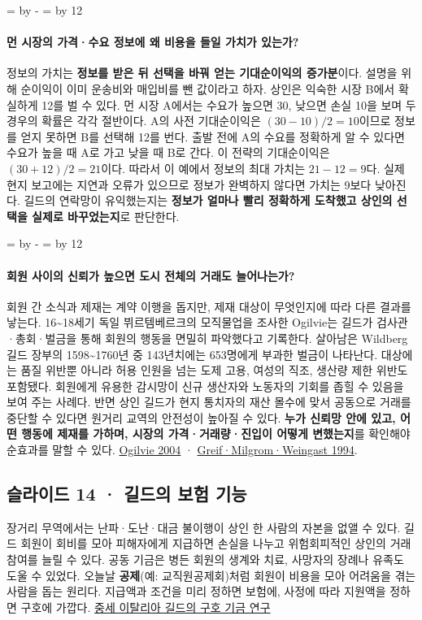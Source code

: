 \documentclass[10pt,a4paper]{article}
\newcommand{\ReserveQuestionSpace}{%
  \par\begingroup
  \dimen0=\pagegoal \advance\dimen0 by -\pagetotal
  \dimen2=\baselineskip \multiply\dimen2 by 12
  \ifdim\dimen0<\dimen2 \newpage\fi
  \endgroup}
\begin{document}
\ReserveQuestionSpace
\paragraph{먼 시장의 가격·수요 정보에 왜 비용을 들일 가치가 있는가?}

정보의 가치는 \textbf{정보를 받은 뒤 선택을 바꿔 얻는 기대순이익의 증가분}이다. 설명을 위해 순이익이 이미 운송비와 매입비를 뺀 값이라고 하자. 상인은 익숙한 시장 B에서 확실하게 12를 벌 수 있다. 먼 시장 A에서는 수요가 높으면 30, 낮으면 손실 10을 보며 두 경우의 확률은 각각 절반이다. A의 사전 기대순이익은 $(30-10)/2=10$이므로 정보를 얻지 못하면 B를 선택해 12를 번다. 출발 전에 A의 수요를 정확하게 알 수 있다면 수요가 높을 때 A로 가고 낮을 때 B로 간다. 이 전략의 기대순이익은 $(30+12)/2=21$이다. 따라서 이 예에서 정보의 최대 가치는 $21-12=9$다. 실제 현지 보고에는 지연과 오류가 있으므로 정보가 완벽하지 않다면 가치는 9보다 낮아진다. 길드의 연락망이 유익했는지는 \textbf{정보가 얼마나 빨리 정확하게 도착했고 상인의 선택을 실제로 바꾸었는지}로 판단한다.\par

\ReserveQuestionSpace
\paragraph{회원 사이의 신뢰가 높으면 도시 전체의 거래도 늘어나는가?}

회원 간 소식과 제재는 계약 이행을 돕지만, 제재 대상이 무엇인지에 따라 다른 결과를 낳는다. 16\textasciitilde{}18세기 독일 뷔르템베르크의 모직물업을 조사한 Ogilvie는 길드가 검사관·총회·벌금을 통해 회원의 행동을 면밀히 파악했다고 기록한다. 살아남은 Wildberg 길드 장부의 1598\textasciitilde{}1760년 중 143년치에는 653명에게 부과한 벌금이 나타난다. 대상에는 품질 위반뿐 아니라 허용 인원을 넘는 도제 고용, 여성의 직조, 생산량 제한 위반도 포함됐다. 회원에게 유용한 감시망이 신규 생산자와 노동자의 기회를 좁힐 수 있음을 보여 주는 사례다. 반면 상인 길드가 현지 통치자의 재산 몰수에 맞서 공동으로 거래를 중단할 수 있다면 원거리 교역의 안전성이 높아질 수 있다. \textbf{누가 신뢰망 안에 있고, 어떤 행동에 제재를 가하며, 시장의 가격·거래량·진입이 어떻게 변했는지}를 확인해야 순효과를 말할 수 있다. \href{https://sheilaghogilvie.com/wp-content/uploads/publications/EcHR-2004-guilds.pdf}{Ogilvie 2004} · \href{https://web.stanford.edu/\%7Eavner/Greif\_Papers/1994\%20Greif\%2C\%20Milgrom\%2C\%20and\%20Weingast\%20JPE\%201994.pdf}{Greif·Milgrom·Weingast 1994}.\par

\subsection{슬라이드 14 · 길드의 보험 기능}
장거리 무역에서는 난파·도난·대금 불이행이 상인 한 사람의 자본을 없앨 수 있다. 길드 회원이 회비를 모아 피해자에게 지급하면 손실을 나누고 위험회피적인 상인의 거래 참여를 늘릴 수 있다. 공동 기금은 병든 회원의 생계와 치료, 사망자의 장례나 유족도 도울 수 있었다. 오늘날 \textbf{공제}(예: 교직원공제회)처럼 회원이 비용을 모아 어려움을 겪는 사람을 돕는 원리다. 지급액과 조건을 미리 정하면 보험에, 사정에 따라 지원액을 정하면 구호에 가깝다. \href{https://riviste.unimi.it/index.php/SSMD/en/article/view/13988}{중세 이탈리아 길드의 구호 기금 연구}\par
\end{document}
